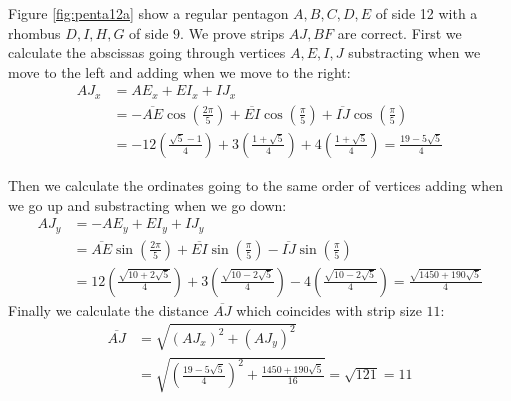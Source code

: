 \documentclass[11pt]{article}
\begin{document}
Figure \ref{fig:penta12a} show a regular pentagon $A,B,C,D,E$ of side 12 with a rhombus $D,I,H,G$ of side $9$. We prove strips $AJ,BF$ are correct. First we calculate the abscissas going through vertices $A,E,I,J$ substracting when we move to the left and adding when we move to the right:
\begin{align}
AJ_x &= AE_x + EI_x + IJ_x\nonumber\\
 &= -\overline{AE}\cos\left(\frac{2\pi}5\right)
 + \overline{EI}\cos\left(\frac{\pi}5\right) 
 + \overline{IJ}\cos\left(\frac{\pi}5\right)\nonumber\\
 &= -12\left(\frac{\sqrt5 - 1}4\right)
  +3\left(\frac{1+\sqrt5}4\right)
  +4\left(\frac{1+\sqrt5}4\right) 
  = \frac{19-5\sqrt5}4
\end{align}

Then we calculate the ordinates going to the same order of vertices adding when we go up and substracting when we go down:
\begin{align}
AJ_y &= -AE_y + EI_y + IJ_y\nonumber\\
 &= \overline{AE}\sin\left(\frac{2\pi}5\right)
 + \overline{EI}\sin\left(\frac{\pi}5\right) 
 - \overline{IJ}\sin\left(\frac{\pi}5\right)\nonumber\\
 &= 12\left(\frac{\sqrt{10+2\sqrt5}}4\right)
 + 3\left(\frac{\sqrt{10-2\sqrt5}}4\right)
 - 4\left(\frac{\sqrt{10-2\sqrt5}}4\right)%
 = \frac{\sqrt{1450+190\sqrt5}}4
\end{align}
Finally we calculate the distance $\overline{AJ}$ which coincides with strip size $11$:
\begin{align}
\overline{AJ} &= \sqrt{(AJ_x)^2 + (AJ_y)^2}\nonumber\\
 &= \sqrt{\left(\frac{19-5\sqrt5}4\right)^2 + \frac{1450+190\sqrt5}{16}}%
 = \sqrt{121} = 11
\end{align}
\end{document}
